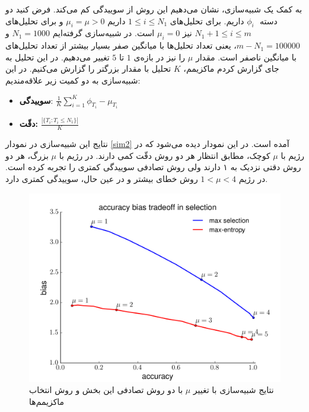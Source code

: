 \documentclass[a4paper,12pt]{article}
\begin{document}
	به کمک یک شبیه‌سازی، نشان می‌دهیم این روش از سوییدگی کم می‌کند. فرض کنید دو دسته ‌
	$\phi_i$
	داریم. برای تحلیل‌های 
	$1\leq i\leq N_1$
	داریم
	$\mu_i = \mu >0$
	و برای تحلیل‌های
	$N_1 + 1\leq i \leq m$
	نیز 
	$\mu_i = 0$
	است. در شبیه‌سازی گرفته‌ایم
	$N_1 = 1000$
	و
	$m - N_1 = 100000$،
	یعنی تعداد تحلیل‌ها با میانگین صفر بسیار بیشتر از تعداد تحلیل‌های با میانگین  ناصفر است. مقدار
	$\mu$
	را نیز در بازه‌ی 
	$1$
	تا
	$5$
	تغییر می‌دهیم.  در این تحلیل  به جای گزارش کردم ماکزیمم،
	$K $
	تحلیل با مقدار بزرگتر را گزارش می‌کنیم.  در این شبیه‌سازی به دو کمیت زیر علاقه‌مندیم:
	
	\begin{itemize}
		\item 
		\textbf{	سوییدگی}: $\frac{1}{K} \sum_{i = 1}^{K} \phi_{T_i} - \mu_{T_i}$
		\item
		\textbf{دقّت:}
		$\frac{|\{T_i:T_i\leq N_1\}|}{K}$
	\end{itemize}
	
	نتایج این شبیه‌سازی در نمودار 
	\eqref{sim2}
	آمده است. در این نمودار دیده می‌شود که در رژيم با 
	$\mu$
	کوچک، مطابق انتظار هر دو روش دقّت کمی دارند. در رژیم با 
	$\mu$
	بزرگ، هر دو روش دقتی نزدیک به ۱ دارند ولی روش  تصادفی 
	سوییدگی کمتری را تجربه کرده است. در رژیم 
	$1<\mu<4$
	روش 
	خطای بیشتر و در عین حال، سوییدگی کمتری دارد.      
	
	\begin{figure}[h!]
		\centering
		\includegraphics[scale=0.5]{fig_3.png}
		\caption{نتایج شبیه‌‌سازی با تغییر 
			$\mu$	
			با دو روش تصادفی این بخش و روش انتخاب ماکزیمم‌ها
		}
		\label{sim2}
	\end{figure}
	
\end{document}
